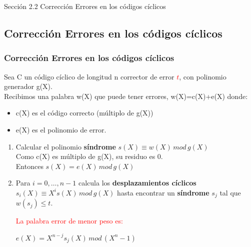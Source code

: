 \documentclass{beamer}
\theoremstyle{plain}
\theoremstyle{example}
\theoremstyle{example}
\begin{document}
\begin{frame}   \footnotesize
{
\begin{block}{Sección 2.2}
Corrección Errores en los códigos cíclicos\end{block}
}
\end{frame} 


\subsection{Corrección Errores en los códigos cíclicos}

\begin{frame}  \frametitle{Corrección Errores en los códigos cíclicos}\small  



Sea C un código cíclico de longitud n corrector de error \textcolor{red}{$t$}, con polinomio generador g(X). \\
\vspace{0.3cm}
Recibimos una palabra w(X) que puede tener errores, w(X)=c(X)+e(X) donde:
\begin{itemize}
    \item c(X) es el código correcto (múltiplo de g(X))
    \item e(X) es el polinomio de error.
\end{itemize}




\begin{enumerate} 

\item  Calcular el polinomio \textbf{síndrome} $s(X) \equiv w(X)\, mod\, g(X)$\\
\vspace{0.3cm}
Como c(X) es múltiplo de g(X), su residuo es 0.\\

Entonces $s(X)= e(X)\, mod\, g(X)$


\item Para $i=0, \ldots, n-1$ calcula los \textbf{desplazamientos cíclicos} $s_i(X) \equiv X^i s(X)\, mod\, g(X)$ hasta encontrar un \textbf{síndrome} $s_j$ tal que $w(s_j)\leq t$. \\
\vspace*{5pt}

\textcolor{red}{La palabra error de menor peso es:} 
\begin{center}
$e(X) =X^{n-j} s_j(X)\, mod\, (X^n-1)$
\end{center}


\end{enumerate} 


\end{frame} 
\end{document}
